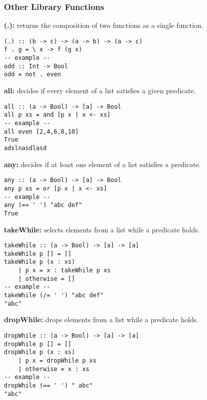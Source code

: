 \subsubsection{Other Library Functions}
\textbf{(.):} returns the composition of two functions as a single function.
\begin{lstlisting}
(.) :: (b -> c) -> (a -> b) -> (a -> c)
f . g = \ x -> f (g x)
-- example --
odd :: Int -> Bool
odd = not . even
\end{lstlisting}
\textbf{all:} decides if every element of a list satisfies a given predicate.
\begin{lstlisting}
all :: (a -> Bool) -> [a] -> Bool
all p xs = and [p x | x <- xs]
-- example --
all even [2,4,6,8,10]
True
adslnasdlasd
\end{lstlisting}
\textbf{any:} decides if at least one element of a list satisfies a predicate.
\begin{lstlisting}
any :: (a -> Bool) -> [a] -> Bool
any p xs = or [p x | x <- xs]
-- example --
any (== ' ') "abc def"
True
\end{lstlisting}
\textbf{takeWhile:} selects elements from a list while a predicate holds.
\begin{lstlisting}
takeWhile :: (a -> Bool) -> [a] -> [a]
takeWhile p [] = []
takeWhile p (x : xs)
    | p x = x : takeWhile p xs
    | otherwise = []
-- example --
takeWhile (/= ' ') "abc def"
"abc"
\end{lstlisting}
\textbf{dropWhile:} drops elements from a list while a predicate holds.
\begin{lstlisting}
dropWhile :: (a -> Bool) -> [a] -> [a]
dropWhile p [] = []
dropWhile p (x : xs)
    | p x = dropWhile p xs
    | otherwise = x : xs
-- example --
dropWhile (== ' ') " abc"
"abc"
\end{lstlisting}